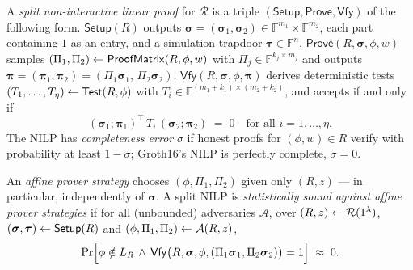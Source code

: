 \documentclass{aicr-conjecture}
\newcommand{\FF}{\mathbb{F}}
\newcommand{\bsig}{\boldsymbol{\sigma}}
\newcommand{\bpi}{\boldsymbol{\pi}}
\newcommand{\LR}{L_R}
\newcommand{\Setup}{\mathsf{Setup}}
\newcommand{\Prove}{\mathsf{Prove}}
\newcommand{\Vfy}{\mathsf{Vfy}}
\newcommand{\Test}{\mathsf{Test}}
\newcommand{\ProofMatrix}{\mathsf{ProofMatrix}}
\begin{document}
\begin{definition}\label{def:nilp}
A \emph{split non-interactive linear proof} for $\mathcal{R}$ is a
triple $(\Setup,\Prove,\Vfy)$ of the following form.  $\Setup(R)$
outputs $\bsig = (\bsig_1,\bsig_2) \in \FF^{m_1} \times \FF^{m_2}$,
each part containing $1$ as an entry, and a simulation trapdoor
$\boldsymbol{\tau} \in \FF^{n}$.  $\Prove(R,\bsig,\phi,w)$ samples
$(\Pi_1,\Pi_2) \sample \ProofMatrix(R,\phi,w)$ with
$\Pi_j \in \FF^{k_j \times m_j}$ and outputs
$\bpi = (\bpi_1,\bpi_2) = (\Pi_1\bsig_1,\, \Pi_2\bsig_2)$.
$\Vfy(R,\bsig,\phi,\bpi)$ derives deterministic tests
$(T_1,\dots,T_\eta) \sample \Test(R,\phi)$ with
$T_i \in \FF^{(m_1+k_1)\times(m_2+k_2)}$, and accepts if and only if
\[
  (\bsig_1;\bpi_1)^{\!\top}\, T_i\, (\bsig_2;\bpi_2) \;=\; 0
  \quad \text{for all } i = 1,\dots,\eta .
\]
The NILP has \emph{completeness error} $\sigma$ if honest proofs for
$(\phi,w) \in R$ verify with probability at least $1 - \sigma$;
Groth16's NILP is perfectly complete, $\sigma = 0$.
\end{definition}

\begin{definition}\label{def:affine}
An \emph{affine prover strategy} chooses $(\phi,\Pi_1,\Pi_2)$ given
only $(R,z)$ --- in particular, independently of $\bsig$.  A split
NILP is \emph{statistically sound against affine prover strategies}
if for all (unbounded) adversaries $\mathcal{A}$, over
$(R,z) \leftarrow \mathcal{R}(1^\lambda)$,
$(\bsig,\boldsymbol{\tau}) \sample \Setup(R)$ and
$(\phi,\Pi_1,\Pi_2) \leftarrow \mathcal{A}(R,z)$,
\[
  \Pr\Bigl[\phi \notin \LR \,\wedge\,
  \Vfy\bigl(R,\bsig,\phi,(\Pi_1\bsig_1,\Pi_2\bsig_2)\bigr) = 1\Bigr]
  \;\approx\; 0 .
\]
\end{definition}
\end{document}
